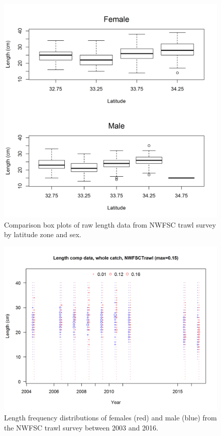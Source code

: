\documentclass[12pt,]{article}
\begin{document}
\begin{figure}[htbp]
\centering
\includegraphics{Figures/NWFSCtrawl_lengthlat.png}
\caption{Comparison box plots of raw length data from NWFSC trawl survey
by latitude zone and sex. \label{fig:NWFSCtrawl_lengthlat}}
\end{figure}

\begin{figure}[htbp]
\centering
\includegraphics{r4ss/plots_mod1/comp_lendat_bubflt8mkt0.png}
\caption{Length frequency distributions of females (red) and male (blue)
from the NWFSC trawl survey between 2003 and 2016.
\label{fig:NWFSCtrawl_lengthcomp}}
\end{figure}
\end{document}
